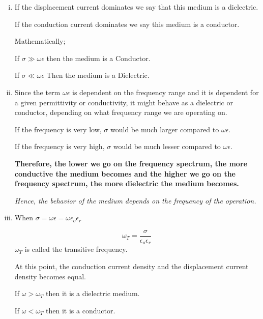 \begin{enumerate}[(i)]
\item If the displacement current dominates we say that this medium is a dielectric.

If the conduction current dominates we say this medium is a conductor.

Mathematically;

If $\sigma \gg \omega\epsilon$ then the medium is a Conductor.

If $\sigma \ll \omega\epsilon$ Then the  medium is a Dielectric.

\item Since the term $\omega\epsilon$ is dependent on the frequency range and it is dependent for a given permittivity or conductivity, it might behave as a dielectric or conductor, depending on what frequency range we are operating on. 

If the frequency is very low, $\sigma$ would be much larger compared to $\omega\epsilon$.

If the frequency is very high, $\sigma$ would be much lesser compared to $\omega\epsilon$.

\textbf{Therefore, the lower we go on the frequency spectrum, the more conductive the medium becomes and the higher we go on the frequency spectrum, the more dielectric the medium becomes.}

\textit{Hence, the behavior of the medium depends on the frequency of the operation.}

\item When $\sigma = \omega\epsilon = \omega\epsilon_{o}\epsilon_{r}$

\begin{equation} \omega_{T} = \dfrac{\sigma}{\epsilon_{o}\epsilon_{r}}
\end{equation}
$\omega_{T}$ is called the transitive frequency.

At this point, the conduction current density and the displacement current density becomes equal.

If $\omega > \omega_{T}$ then it is a dielectric medium.

If $\omega < \omega_{T}$ then it is a conductor.
\end{enumerate}


